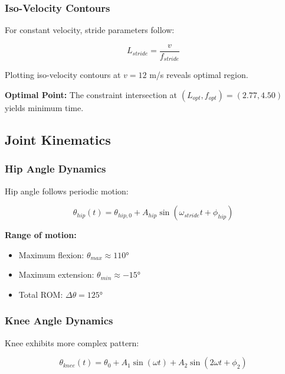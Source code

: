 \subsubsection{Iso-Velocity Contours}

For constant velocity, stride parameters follow:

\begin{equation}
L_{stride} = \frac{v}{f_{stride}}
\label{eq:iso_velocity}
\end{equation}

Plotting iso-velocity contours at $v = 12$ m/s reveals optimal region.

\textbf{Optimal Point:} The constraint intersection at $(L_{opt}, f_{opt}) = (2.77, 4.50)$ yields minimum time.

\subsection{Joint Kinematics}

\subsubsection{Hip Angle Dynamics}

Hip angle follows periodic motion:

\begin{equation}
\theta_{hip}(t) = \theta_{hip,0} + A_{hip} \sin(\omega_{stride} t + \phi_{hip})
\label{eq:hip_angle}
\end{equation}

\textbf{Range of motion:}
\begin{itemize}
\item Maximum flexion: $\theta_{max} \approx 110°$
\item Maximum extension: $\theta_{min} \approx -15°$
\item Total ROM: $\Delta\theta = 125°$
\end{itemize}

\subsubsection{Knee Angle Dynamics}

Knee exhibits more complex pattern:

\begin{equation}
\theta_{knee}(t) = \theta_{0} + A_1 \sin(\omega t) + A_2 \sin(2\omega t + \phi_2)
\label{eq:knee_angle}
\end{equation}

